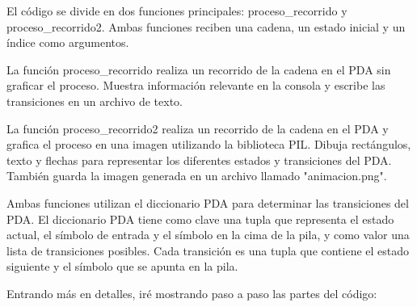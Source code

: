 El código se divide en dos funciones principales: proceso\_recorrido y proceso\_recorrido2. Ambas funciones reciben una cadena, un estado inicial y un índice como argumentos.\newline

La función proceso\_recorrido realiza un recorrido de la cadena en el PDA sin graficar el proceso. Muestra información relevante en la consola y escribe las transiciones en un archivo de texto.\newline

La función proceso\_recorrido2 realiza un recorrido de la cadena en el PDA y grafica el proceso en una imagen utilizando la biblioteca PIL. Dibuja rectángulos, texto y flechas para representar los diferentes estados y transiciones del PDA. También guarda la imagen generada en un archivo llamado "animacion.png".\newline

Ambas funciones utilizan el diccionario PDA para determinar las transiciones del PDA. El diccionario PDA tiene como clave una tupla que representa el estado actual, el símbolo de entrada y el símbolo en la cima de la pila, y como valor una lista de transiciones posibles. Cada transición es una tupla que contiene el estado siguiente y el símbolo que se apunta en la pila.\newline

Entrando más en detalles, iré mostrando paso a paso las partes del código:\newline


\newpage
\\

